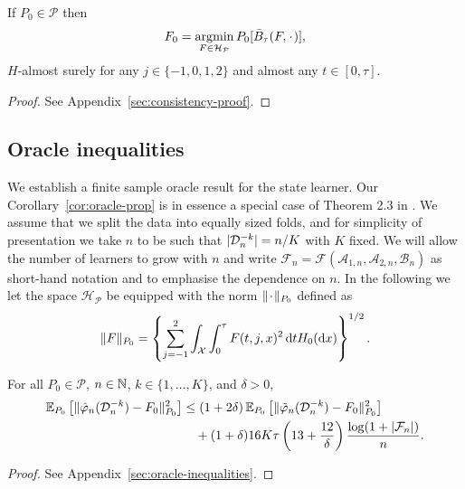 \begin{proposition}
  \label{prop:stric-prop}
  If \(P_0\in\mathcal{P}\) then
  \begin{equation*}
    F_0 = \argmin_{F \in \mathcal{H}_{\mathcal{P}}} P_0{[\bar{B}_\tau(F, \blank)]},
  \end{equation*}
  \( H \)-almost surely for any \( j\in \{-1,0,1,2\} \) and almost any
  \( t \in [0, \tau]\).
\end{proposition}
\begin{proof}
  See Appendix~\ref{sec:consistency-proof}.
\end{proof}

\subsection{Oracle inequalities}
\label{sec:finite-sample-oracle}

We establish a finite sample oracle result for the state learner. Our
Corollary~\ref{cor:oracle-prop} is in essence a special case of
Theorem 2.3 in \citep{vaart2006oracle}.  We assume that we split the
data into equally sized folds, and for simplicity of presentation we
take \( n \) to be such that \( |\mathcal{D}_n^{-k}| = n/K \) with \( K \)
fixed. We will allow the number of learners to grow with \( n \) and
write
\( \mathcal{F}_n=\mathcal{F}(\mathcal{A}_{1,n}, \mathcal{A}_{2,n},
\mathcal{B}_n)\) as short-hand notation and to emphasise the
dependence on \( n \).
In the following we let the space \( \mathcal{H}_{\mathcal{P}} \) be equipped with the norm
\( \| \blank \|_{P_0} \) defined as
\begin{equation}
  \label{eq:norm}
  \| F \|_{P_0} = 
  \left\{
    \sum_{j=-1}^{2}\int_{\mathcal{X}} \int_0^{\tau} F(t, j, x)^2 \mathop{}\!\mathrm{d} t H_0( \mathop{}\!\mathrm{d} x)
  \right\}^{1/2}.
\end{equation}

\begin{corollary}
  \label{cor:oracle-prop}
  For all \(P_0\in\mathcal{P}\), \( n \in \mathbb{N} \), \( k \in \{1, \dots, K\} \),
  and $\delta>0$,
  \begin{align*}
    \operatorname{\mathbb{E}}_{P_0}{\left[ \Vert \hat{\varphi}_n(\mathcal{D}_n^{-k}) - F_0 \Vert_{P_0}^2 \right]}
    & \leq (1 + 2\delta)
      \operatorname{\mathbb{E}}_{P_0}{\left[ \Vert \tilde{\varphi}_n(\mathcal{D}_n^{-k}) - F_0 \Vert_{P_0}^2 \right]}
    \\
    & \quad
      + (1+ \delta) 16   K \tau
      \left(
      13 + \frac{12}{\delta}
      \right)
      \frac{\log(1 + |\mathcal{F}_n|)}{n}.
  \end{align*}
\end{corollary}
\begin{proof}
  See Appendix~\ref{sec:oracle-inequalities}.
\end{proof}

